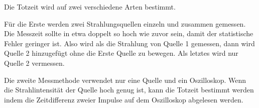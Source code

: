 Die Totzeit wird auf zwei verschiedene Arten bestimmt.

Für die Erste werden zwei Strahlungsquellen einzeln und zusammen gemessen.
Die Messzeit sollte in etwa doppelt so hoch wie zuvor sein, damit der statistische Fehler geringer ist.
Also wird als die Strahlung von Quelle 1 gemessen, dann wird Quelle 2 hinzugefügt ohne die Erste Quelle zu bewegen.
Als letztes wird nur Quelle 2 vermessen.

Die zweite Messmethode verwendet nur eine Quelle und ein Oszilloskop.
Wenn die Strahlintensität der Quelle hoch genug ist, kann die Totzeit bestimmt werden indem die Zeitdifferenz zweier Impulse auf dem Oszilloskop abgelesen werden.